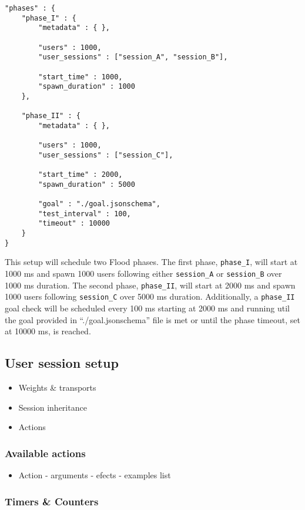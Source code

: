 \documentclass[a4paper]{article}
\begin{document}
\begin{verbatim}
"phases" : {
    "phase_I" : {
        "metadata" : { },

        "users" : 1000,
        "user_sessions" : ["session_A", "session_B"],

        "start_time" : 1000,
        "spawn_duration" : 1000
    },

    "phase_II" : {
        "metadata" : { },

        "users" : 1000,
        "user_sessions" : ["session_C"],

        "start_time" : 2000,
        "spawn_duration" : 5000

        "goal" : "./goal.jsonschema",
        "test_interval" : 100,
        "timeout" : 10000
    }
}
\end{verbatim}




\noindent
This setup will schedule two Flood phases. The first phase, \texttt{phase\_I}, will start at 1000 ms and spawn 1000 users following either \texttt{session\_A} or \texttt{session\_B} over 1000 ms duration. The second phase, \texttt{phase\_II}, will start at 2000 ms and spawn 1000 users following \texttt{session\_C} over 5000 ms duration. Additionally, a \texttt{phase\_II} goal check will be scheduled every 100 ms starting at 2000 ms and running util the goal provided in ``./goal.jsonschema'' file is met or until the phase timeout, set at 10000 ms, is reached.
\subsection{User session setup}
\label{sec-3-4}
\label{ref-session_setup}



\begin{itemize}
\item Weights \& transports
\item Session inheritance
\item Actions
\end{itemize}
\subsubsection{Available actions}
\label{sec-3-4-1}


\begin{itemize}
\item Action - arguments - efects - examples list
\end{itemize}
\subsubsection{Timers \& Counters}
\label{sec-3-4-2}
\end{document}
